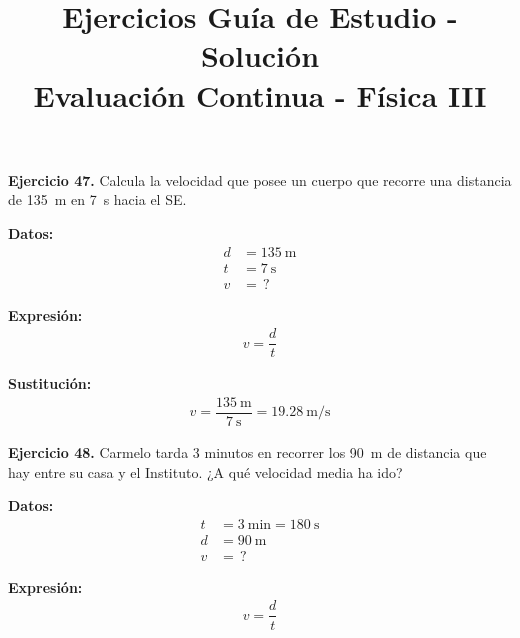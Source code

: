 \documentclass[14pt]{extarticle}
\title{\vspace*{-2cm} Ejercicios Guía de Estudio - Solución\\  Evaluación Continua - Física III\vspace{-5ex}}
\date{}
\begin{document}
\maketitle

\vspace*{0.75cm}

\textbf{Ejercicio 47. } Calcula la velocidad que posee un cuerpo que recorre una distancia de \SI{135}{\meter} en \SI{7}{\second} hacia el SE.

\vspace*{0.3cm}
\begin{minipage}[t]{0.4\linewidth}
\textbf{Datos:}
\begin{align*}
d &= \SI{135}{\meter} \\
t &= \SI{7}{\second} \\
v &= \, ?
\end{align*}
\end{minipage}
\begin{minipage}[t]{0.4\linewidth}
\textbf{Expresión:}
\begin{align*}
v = \dfrac{d}{t}
\end{align*}
\end{minipage}

\vspace*{0.3cm}
\textbf{Sustitución:}
\begin{align*}
v = \dfrac{\SI{135}{\meter}}{\SI{7}{\second}} = \SI[per-mode=fraction]{19.28}{\meter\per\second}
\end{align*}

\vspace*{0.3cm}
\textbf{Ejercicio 48. } Carmelo tarda 3 minutos en recorrer los \SI{90}{\meter} de distancia que hay entre su casa y el Instituto. ¿A qué velocidad media ha ido?

\vspace*{0.3cm}
\begin{minipage}[t]{0.4\linewidth}
\textbf{Datos:}
\begin{align*}
t &= \SI{3}{\minute} = \SI{180}{\second} \\
d &= \SI{90}{\meter} \\
v &= \, ?
\end{align*}
\end{minipage}
\begin{minipage}[t]{0.4\linewidth}
\textbf{Expresión:}
\begin{align*}
v = \dfrac{d}{t}
\end{align*}
\end{minipage}
\end{document}
